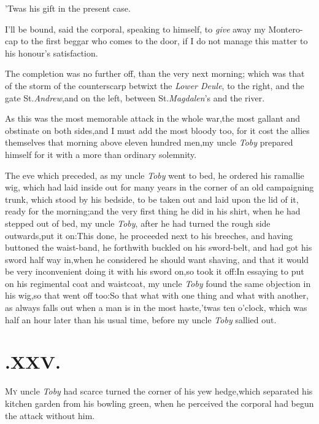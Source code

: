 \documentclass{article}
\begin{document}
\tsh ’Twas his gift in the present case.

I’ll be bound, said the corporal, speaking to himself, to
\textit{give} away my Montero-cap to the first beggar who comes to the door,
if I do not manage this matter to\break
his honour’s satisfaction.

The completion was no further off, than the very next morning; which was that of the
storm of the counterscarp betwixt the \textit{Lower Deule}, to the right, and the
gate St.\@ \textit{Andrew},\tsk and on the left, between St.\@ \textit{Magdalen}’s
and the river.

As this was the most memorable attack in the whole
war,\tsk the most gallant and obstinate on both sides,\tsk and
I must add the most bloody too, for it cost the allies themselves
that morning above eleven hundred men,\tsk my uncle \textit{Toby}
prepared himself for it with a more than ordinary solemnity.

The eve which preceded, as my uncle \textit{Toby} went to bed, he
ordered his ramallie wig, which had laid inside out for many years
in the corner of an old campaigning trunk, which stood by his
\setlength{\baselineskip}{13.3636pt}%
bedside, to be taken out and laid upon the lid of it, ready for the morning;\tsk and the
very first thing he did in his shirt, when he had stepped out of
bed, my uncle \textit{Toby}, after he had turned the rough side
outwards,\tsk put it on:\tsh\break This done, he proceeded
next to his breeches, and having buttoned the waist-band, he
forthwith buckled on his sword-belt, and had got his sword half way
in,\break\tsk when he considered he should want shaving, and that it
would be very inconvenient doing it with his sword on,\tsk so
took it off:\tsh In essaying to put on his regimental coat
and waistcoat, my uncle \textit{Toby} found the same objection in his
wig,\tsk so that went off too:\tsk So that what with one thing
and what with another, as always falls out when a man is in the
most haste,\tsk ’twas ten o’clock, which was half an
hour later than his usual time, before my uncle \textit{Toby} sallied
out.

\enlargethispage\baselineskip
\section{.\enspace XXV.}

\lettrine{M}{y} uncle \textit{Toby} had scarce
turned the corner of his yew hedge,\break which separated his
kitchen garden from his bowling green, when he perceived the
corporal had begun the attack without him.\tsh
\end{document}
